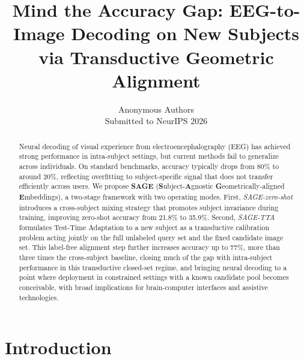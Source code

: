 \documentclass{article}
\title{Mind the Accuracy Gap: EEG-to-Image Decoding on New Subjects via Transductive Geometric Alignment}
\author{%
  Anonymous Authors\\
  Submitted to NeurIPS 2026\\
}
\begin{document}
\maketitle

\begin{abstract}

Neural decoding of visual experience from electroencephalography (EEG) has achieved strong performance in intra-subject settings, but current methods fail to generalize across individuals. On standard benchmarks, accuracy typically drops from 80\% to around 20\%, reflecting overfitting to subject-specific signal that does not transfer efficiently across users. We propose \textbf{SAGE} (\textbf{S}ubject-\textbf{A}gnostic \textbf{G}eometrically-aligned \textbf{E}mbeddings), a two-stage framework with two operating modes. First, \emph{SAGE-zero-shot} introduces a cross-subject mixing strategy that promotes subject invariance during training, improving zero-shot accuracy from 21.8\% to 35.9\%. Second, \emph{SAGE-TTA} formulates Test-Time Adaptation to a new subject as a transductive calibration problem acting jointly on the full unlabeled query set and the fixed candidate image set. This label-free alignment step further increases accuracy up to 77\%, more than three times the cross-subject baseline, closing much of the gap with intra-subject performance in this transductive closed-set regime, and bringing neural decoding to a point where deployment in constrained settings with a known candidate pool becomes conceivable, with broad implications for brain-computer interfaces and assistive technologies.
\end{abstract}

\section{Introduction}
\label{sec:intro}
\end{document}
